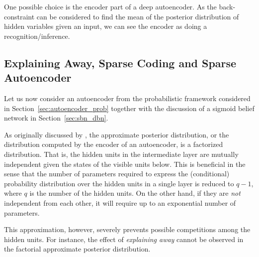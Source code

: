 \documentclass{now}
\begin{document}
One 
possible choice is the encoder part of a deep
autoencoder. As the back-constraint can be considered to
find the mean of the posterior distribution of hidden
variables given an input, we can 
see the encoder
as doing a recognition/inference.


\subsection{Explaining Away, Sparse Coding and Sparse
Autoencoder}
\label{sec:explain_away}

Let us now consider an autoencoder from the probabilistic
framework considered in Section~\ref{sec:autoencoder_prob}
together with the discussion of a sigmoid belief network in
Section~\ref{sec:sbn_dbn}. 

As originally discussed by \citet{Hinton1995}, the
approximate posterior distribution, or the distribution
computed by the encoder of an autoencoder, is a factorized
distribution. That is, the hidden units in the intermediate
layer are mutually independent given the states of the
visible units below. This is beneficial in the sense that
the number of parameters required to express the
(conditional) probability distribution over the hidden units
in a single layer is reduced to $q-1$, where $q$ is the
number of the hidden units. On the other hand, if they are
\textit{not} independent from each other, it will require up
to an exponential number of parameters.

This approximation, however, severely prevents possible
competitions among the hidden units. For instance, the
effect of \textit{explaining away} \citep[see,
e.g.,][]{Wellman1993} cannot be observed in the factorial
approximate posterior distribution. 

\end{document}
